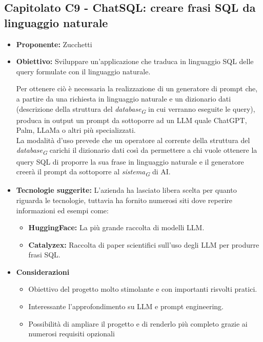 \documentclass{article}
\begin{document}

\subsection{\textbf{Capitolato C9} - ChatSQL: creare frasi SQL da linguaggio naturale}
\begin{itemize}
    \item[] \textbf{Proponente:} Zucchetti
    
    \item[] \textbf{Obiettivo:} Sviluppare un’applicazione che traduca in linguaggio SQL delle query formulate con il linguaggio naturale.
    
    Per ottenere ciò è necessaria la realizzazione di un generatore di prompt che, a partire da una richiesta in linguaggio naturale e un dizionario dati (descrizione della struttura del \textit{database}\textsubscript{\textit{G}} in cui verranno eseguite le query), produca in output un prompt da sottoporre ad un LLM quale ChatGPT, Palm, LLaMa o altri più specializzati. \\
    La modalità d’uso prevede che un operatore al corrente della  struttura del \textit{database}\textsubscript{\textit{G}} carichi il dizionario dati così da permettere a chi vuole ottenere la query SQL di proporre la sua frase in linguaggio naturale e il generatore  creerà il prompt da sottoporre al \textit{sistema}\textsubscript{\textit{G}} di AI.
    
    \item[] \textbf{Tecnologie suggerite:} L’azienda ha lasciato libera scelta per quanto riguarda le tecnologie, tuttavia ha fornito numerosi siti dove reperire informazioni ed esempi come:
    \begin{itemize}
        \item \textbf{HuggingFace:} La più grande raccolta di modelli LLM.
        \item \textbf{Catalyzex:} Raccolta di paper scientifici sull'uso degli LLM per produrre frasi SQL.
    \end{itemize}
    
    \item[] \textbf{Considerazioni}
    \begin{itemize}
        \item Obiettivo del progetto molto stimolante e con importanti risvolti pratici.
        \item Interessante l’approfondimento su LLM e prompt engineering.
        \item Possibilità di ampliare il progetto e di renderlo più completo grazie ai numerosi requisiti opzionali
    \end{itemize} 

\end{itemize}
\pagebreak
\end{document}
